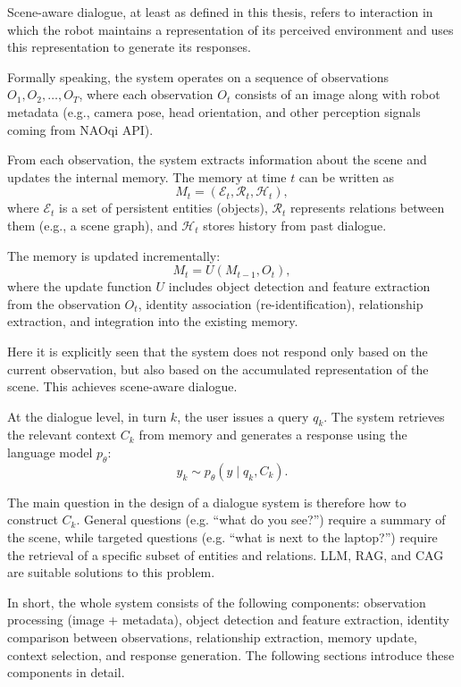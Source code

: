 Scene-aware dialogue, at least as defined in this thesis, refers to interaction in which the robot maintains a representation of its perceived environment and uses this representation to generate its responses.

Formally speaking, the system operates on a sequence of observations \(O_1, O_2, \ldots, O_T\), where each observation \(O_t\) consists of an image along with robot metadata (e.g., camera pose, head orientation, and other perception signals coming from NAOqi API).

From each observation, the system extracts information about the scene and updates the internal memory. The memory at time \(t\) can be written as
\[
M_t = (\mathcal{E}_t, \mathcal{R}_t, \mathcal{H}_t),
\]
where \(\mathcal{E}_t\) is a set of persistent entities (objects), \(\mathcal{R}_t\) represents relations between them (e.g., a scene graph), and \(\mathcal{H}_t\) stores history from past dialogue.


The memory is updated incrementally:
\[
M_t = U(M_{t-1}, O_t),
\]
where the update function \(U\) includes object detection and feature extraction from the observation \(O_t\), identity association (re-identification), relationship extraction, and integration into the existing memory.

Here it is explicitly seen that the system does not respond only based on the current observation, but also based on the accumulated representation of the scene. This achieves scene-aware dialogue.

At the dialogue level, in turn \(k\), the user issues a query \(q_k\). The system retrieves the relevant context \(C_k\) from memory and generates a response using the language model $p_\theta$:
\[
y_k \sim p_\theta(y \mid q_k, C_k).
\]

The main question in the design of a dialogue system is therefore how to construct \(C_k\). General questions (e.g. \enquote{what do you see?}) require a summary of the scene, while targeted questions (e.g. \enquote{what is next to the laptop?}) require the retrieval of a specific subset of entities and relations. LLM, RAG, and CAG are suitable solutions to this problem.

In short, the whole system consists of the following components: observation processing (image + metadata), object detection and feature extraction, identity comparison between observations, relationship extraction, memory update, context selection, and response generation. The following sections introduce these components in detail.

